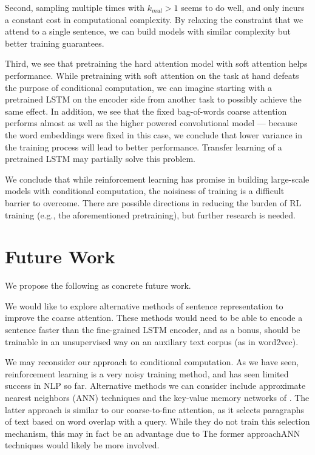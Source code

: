 \documentclass[12pt]{report}
\begin{document}
Second, sampling multiple times with $k_{mul} > 1$ seems to do well, and only incurs a constant cost in computational complexity. By relaxing the constraint that we attend to a single sentence, we can build models with similar complexity but better training guarantees. 


Third, we see that pretraining the hard attention model with soft attention helps performance. While pretraining with soft attention on the task at hand defeats the purpose of conditional computation, we can imagine starting with a pretrained LSTM on the encoder side from another task to possibly achieve the same effect.
In addition, we see that the fixed bag-of-words coarse attention performs almost as well as the higher powered convolutional model --- because the word embeddings were fixed in this case, we conclude that lower variance in the training process will lead to better performance. Transfer learning of a pretrained LSTM may partially solve this problem.

We conclude that while reinforcement learning has promise in building large-scale models with conditional computation, the noisiness of training is a difficult barrier to overcome. There are possible directions in reducing the burden of RL training (e.g., the aforementioned pretraining), but further research is needed.


\section{Future Work}

We propose the following as concrete future work.

We would like to explore alternative methods of sentence representation to improve the coarse attention. These methods would need to be able to encode a sentence faster than the fine-grained LSTM encoder, and as a bonus, should be trainable in an unsupervised way on an auxiliary text corpus (as in word2vec).

We may reconsider our approach to conditional computation. As we have seen, reinforcement learning is a very noisy training method, and has seen limited success in NLP so far.
Alternative methods we can consider include approximate nearest neighbors (ANN) techniques \citep{rae2016sparsememory} and the key-value memory networks of \citet{Miller2016}.
The latter approach is similar to our coarse-to-fine attention, as it selects paragraphs of text based on word overlap with a query. While they do not train this selection mechanism, this may in fact be an advantage due to 
The former approachANN techniques would likely be more involved.
\end{document}
